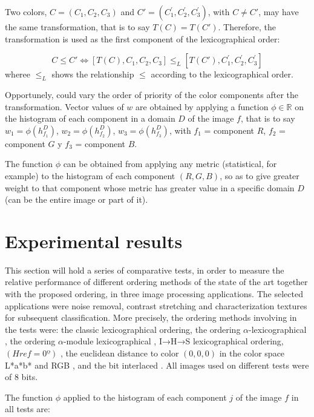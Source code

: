 Two colors, $C=(C_1,C_2,C_3)$ and $C'=(C_1^{'},C_2^{'},C_3^{'})$, with $C\neq C'$, may have the same transformation, that is to say $T(C) = T(C')$.  Therefore, the transformation is used as the first component of the lexicographical order:

\begin{equation}
\label{Mio} 
 C\leq C'\Leftrightarrow [T(C),C_1,C_2,C_3] \leq_L [T(C'),C_1^{'},C_2^{'},C_3^{'}]
\end{equation} wheree $\leq_L$ shows the relationship $\leq$ according to the lexicographical order.	

Opportunely, could vary the order of priority of the color components after the transformation.
Vector values of $w$ are obtained by applying a function $\phi \in \mathbb{R}$ on the histogram of each component in a domain $D$ of the image $f$, that is to say $w_1 = \phi(h_{f_1}^D)$, $w_2 = \phi(h_{f_2}^D)$, $w_3 = \phi(h_{f_3}^D)$, with $f_1$ = component $R$, $f_2$ = component $G$ y $f_3$ =  component $B$.

The function $\phi$ can be obtained from applying any metric (statistical, for example) to the histogram of each component $(R,G,B)$, so as to give greater weight to that component whose metric has greater value in a specific domain $D$ (can be the entire image or part of it). 

 \section{Experimental results}

This section will hold a series of comparative tests, in order to measure the relative performance of different ordering methods of the state of the art together with the proposed ordering, in three image processing applications. The selected applications were noise removal, contrast stretching and characterization textures for subsequent classification.
More precisely, the ordering methods involving in the tests were:
the classic lexicographical ordering, the ordering $\alpha$-lexicographical \cite{zamora2001comparative}, the ordering $\alpha$-module lexicographical \cite{angulo2003morphological}, I→H→S lexicographical ordering, $(Href=0º)$ \cite{ortiz2004gaussian}, the euclidean distance to color $(0,0,0)$ in the color space L*a*b* and RGB \cite{ortiz2002procesamiento}, 
and the bit interlaced \cite{chanussot1997bit}. 
All images used on different tests were of $8$ bits. 

The function $\phi$ applied to the histogram of each component $j$ of the image $f$ in all tests are:

